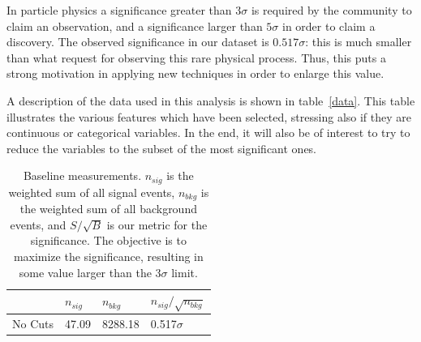 \documentclass[11pt]{article}
\begin{document}
In particle physics a significance greater than $3\sigma$ is required by the community to claim an observation, and a significance larger than $5\sigma$ in order to claim a discovery. The observed significance in our dataset is $0.517\sigma$: this is much smaller than what request for observing this rare physical process. Thus, this puts a strong motivation in applying new techniques in order to enlarge this value.

A description of the data used in this analysis is shown in table~\ref{data}. This table illustrates the various features which have been selected, stressing also if they are continuous or categorical variables.
In the end, it will also be of interest to try to reduce the variables to the subset of the most significant ones. 

\begin{table}[!htbp]
\begin{center}
\begin{tabular}{|l|l|l|l|}

  \cline{2-4}
  \multicolumn{1}{c|}{} & $n_{sig}$ & $n_{bkg}$ & $n_{sig}/\sqrt{n_{bkg}}$ \\
  \hline
  No Cuts & 47.09 & 8288.18 & 0.517$\sigma$ \\
  \hline
\end{tabular}
\caption{Baseline measurements. $n_{sig}$ is the weighted sum of all signal events, $n_{bkg}$ is the weighted sum of all background events, and $S/\sqrt{B}$ is our metric for the significance. The objective is to maximize the significance, resulting in some value larger than the 3$\sigma$ limit.}
\label{baselines}
\end{center}
\end{table}
\end{document}
